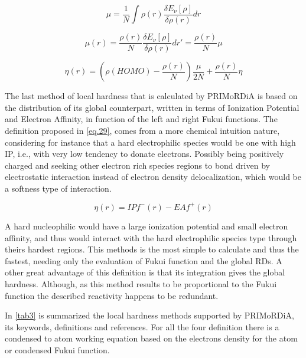 \documentclass[a4paper,11pt]{refart}
\begin{document}
\begin{equation}
\mu = \frac{1}{N} \int \rho(r) \frac{\delta E_\nu[\rho]}{\delta \rho(r)} dr
\label{eq.28.2}
\end{equation}


\begin{equation}
\mu(r) =  \frac{\rho(r)}{N} \frac{\delta E_\nu[\rho]}{\delta \rho(r)} dr'  = \frac{\rho(r)}{N} \mu
\label{eq.28.3}
\end{equation}


\begin{equation}
\eta(r) = \left (\rho(HOMO) - \frac{\rho(r)}{N} \right) \frac{\mu}{2N} + \frac{\rho(r)}{N}\eta
\label{eq.28}
\end{equation}

The last method of local hardness that is calculated by PRIMoRDiA is based on the distribution of its global counterpart, written in terms of Ionization Potential and Electron Affinity, in function of the left and right Fukui functions\cite{meneses2004proposal}. The definition proposed in \autoref{eq.29}, comes from a more chemical intuition nature, considering for instance that a hard electrophilic species would be one with high IP, i.e., with very low tendency to donate electrons. Possibly being positively charged and seeking other electron rich species regions to bond driven by electrostatic interaction instead of electron density delocalization, which would be a softness type of interaction.

\begin{equation}
\eta(r) = IP f^-(r) - EA f^+(r)
\label{eq.29} 
\end{equation}

A hard nucleophilic would have a large ionization potential and small electron affinity, and thus would interact with the hard electrophilic species type through theirs hardest regions. This methods is the most simple to calculate and thus the fastest, needing only the evaluation of Fukui function and the global RDs. A other great advantage of this definition is that its integration gives the global hardness. Although, as this method results to be proportional to the Fukui function the described reactivity happens to be redundant. 
 
In \autoref{tab3} is summarized the local hardness methods supported by PRIMoRDiA, its keywords, definitions and references. For all the four definition there is a condensed to atom working equation based on the electrons density for the atom or condensed Fukui function. 
 
\end{document}
